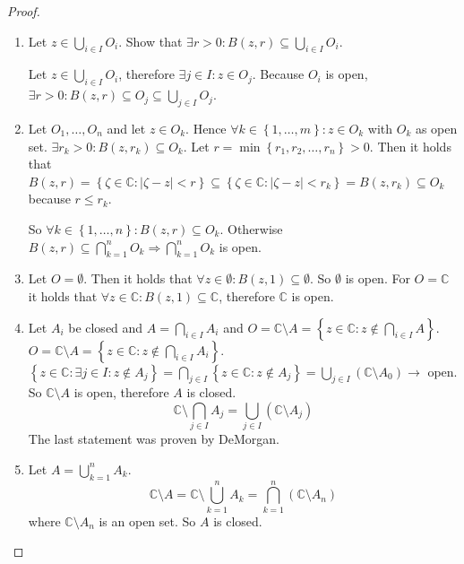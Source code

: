 \documentclass[a4paper,landscape,twocolumn]{article}
\theoremstyle{definition}
\newcommand\set[1]{\left\{#1\right\}}
\newcommand\abs[1]{\left|#1\right|}
\begin{document}
\begin{proof}
  \begin{enumerate}
    \item
      Let $z \in \bigcup_{i \in I} O_i$. Show that $\exists r > 0: B(z, r) \subseteq \bigcup_{i \in I} O_i$.

      Let $z \in \bigcup_{i \in I} O_i$, therefore $\exists j \in I: z \in O_j$.
      Because $O_i$ is open, $\exists r > 0: B(z, r) \subseteq O_j \subseteq \bigcup_{j \in I} O_j$.
    \item
      Let $O_1, \ldots, O_n$ and let $z \in O_k$.
      Hence $\forall k \in \set{1, \dots, m}: z \in O_k$ with $O_k$ as open set.
      $\exists r_k > 0: B(z, r_k) \subseteq O_k$.
      Let $r = \min\set{r_1, r_2, \dots, r_n} > 0$.
      Then it holds that $B(z, r) = \set{\zeta \in \mathbb C: \abs{\zeta - z} < r}
      \subseteq \set{\zeta \in \mathbb C: \abs{\zeta - z} < r_k} = B(z, r_k) \subseteq O_k$ because $r \leq r_k$.

      So $\forall k \in \set{1, \dots, n}: B(z, r) \subseteq O_k$. Otherwise $B(z, r) \subseteq \bigcap_{k=1}^n O_k \Rightarrow \bigcap_{k=1}^n O_k$ is open.
    \item
      Let $O = \emptyset$. Then it holds that $\forall z \in \emptyset: B(z, 1) \subseteq \emptyset$.
      So $\emptyset$ is open.
      For $O = \mathbb C$ it holds that $\forall z \in \mathbb C: B(z, 1) \subseteq \mathbb C$,
      therefore $\mathbb C$ is open.
    \item
      Let $A_i$ be closed and $A = \bigcap_{i \in I} A_i$ and $O = \mathbb C \setminus A = \set{z \in \mathbb C: z \not\in \bigcap_{i \in I} A}$. $O = \mathbb C \setminus A = \set{z \in \mathbb C: z \not\in \bigcap_{i \in I} A_i}$.
      $\set{z \in \mathbb C: \exists j \in I: z \not\in A_j} = \bigcap_{j \in I} \set{z \in \mathbb C: z \not\in A_j}
      = \bigcup_{j \in I} \left(\mathbb C \setminus A_0\right) \to$ open.
      So $\mathbb C \setminus A$ is open, therefore $A$ is closed.
      \[ \mathbb C \setminus \bigcap_{j \in I} A_j = \bigcup_{j \in I} (\mathbb C \setminus A_j) \]
      The last statement was proven by DeMorgan.
    \item
      Let $A = \bigcup_{k=1}^n A_k$.
      \[ \mathbb C \setminus A = \mathbb C \setminus \bigcup_{k=1}^n A_k = \bigcap_{k=1}^n (\mathbb C \setminus A_n) \]
      where $\mathbb C \setminus A_n$ is an open set.
      So $A$ is closed.
  \end{enumerate}
\end{proof}
\end{document}
